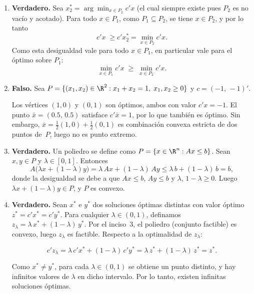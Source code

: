 \begin{enumerate}

\item
\textbf{Verdadero.} Sea $x^*_2 = \arg\min_{x \in P_2} c'x$ (el cual siempre existe pues $P_2$ es no vacío y acotado). Para todo $x \in P_1$, como $P_1 \subseteq P_2$, se tiene $x \in P_2$, y por lo tanto
\[
  c'x \;\geq c'x^*_2 = \min_{x \in P_2} c'x.
\]
Como esta desigualdad vale para todo $x \in P_1$, en particular vale para el óptimo sobre $P_1$:
\[
  \min_{x \in P_1} c'x \;\geq\; \min_{x \in P_2} c'x.
\]

\item
\textbf{Falso.} Sea $P = \{(x_1,x_2) \in \R^2 : x_1 + x_2 = 1,\; x_1,x_2 \geq 0\}$ y $c = (-1,\,-1)'$.
 
Los vértices $(1,0)$ y $(0,1)$ son óptimos, ambos con valor $c'x = -1$. El punto $\bar{x} = (0.5,\, 0.5)$ satisface $c'\bar{x} = 1$, por lo que también es óptimo. Sin embargo, $\bar{x} = \frac{1}{2}(1,0) + \frac{1}{2}(0,1)$ es combinación convexa estricta de dos puntos de~$P$, luego no es punto extremo.

\item
\textbf{Verdadero.} Un poliedro se define como $P = \{x \in \R^n : Ax \leq b\}$. Sean $x, y \in P$ y $\lambda \in [0,1]$. Entonces
\[
  A\bigl(\lambda x + (1-\lambda)y\bigr)
  = \lambda\, Ax + (1-\lambda)\, Ay
  \leq \lambda\, b + (1-\lambda)\, b
  = b,
\]
donde la desigualdad se debe a que $Ax \leq b$, $Ay \leq b$ y $\lambda,\, 1-\lambda \geq 0$. Luego $\lambda x + (1-\lambda)y \in P$, y $P$ es convexo.

\item
\textbf{Verdadero.} Sean $x^*$ e $y^*$ dos soluciones óptimas distintas con valor óptimo $z^* = c'x^* = c'y^*$. Para cualquier $\lambda \in (0,1)$, definamos
$z_\lambda = \lambda\, x^* + (1-\lambda)\, y^*$. Por el inciso~3, el poliedro (conjunto factible) es convexo, luego $z_\lambda$ es factible. Respecto a la optimalidad de $z_\lambda$:
 
\[
  c' z_\lambda
  = \lambda\, c' x^* + (1-\lambda)\, c' y^*
  = \lambda\, z^* + (1-\lambda)\, z^*
  = z^*.
\]
 
Como $x^* \neq y^*$, para cada $\lambda \in (0,1)$ se obtiene un punto distinto, y hay infinitos valores de $\lambda$ en dicho intervalo. Por lo tanto, existen infinitas soluciones óptimas.\\

\end{enumerate}

